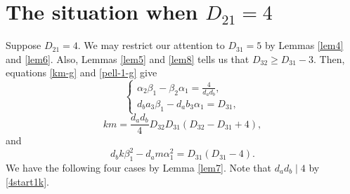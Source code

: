\documentclass[12pt]{article}
\begin{document}


\section{The situation when $D_{21} = 4$}

Suppose $D_{21} = 4$. We may restrict our attention to $D_{31} = 5$ by Lemmas \ref{lem4} and \ref{lem6}. Also, Lemmas \ref{lem5} and \ref{lem8} tells us that $D_{32}\geq D_{31} - 3$. Then, equations \eqref{km-g} and \eqref{pell-1-g} give
\begin{equation} \label{4start1k}
\left\{ \begin{array}{l} \alpha_2 \beta_1 - \beta_2 \alpha_1 = \frac{4}{d_a d_b}, \\
d_b a_3 \beta_1 - d_a b_3 \alpha_1 = D_{31},
\end{array} \right.
\end{equation}
\begin{equation*} \label{km-4}
k m = \frac{d_a d_b}{4}{D_{32} D_{31} (D_{32} - D_{31} + 4)},
\end{equation*}
and
\begin{equation} \label{pell-4}
d_b k \beta_1^2 - d_a m \alpha_1^2 = D_{31} (D_{31} - 4).
\end{equation}
\noindent We have the following four cases by Lemma \ref{lem7}. Note that $d_a d_b \mid 4$ by \eqref{4start1k}.
\end{document}
